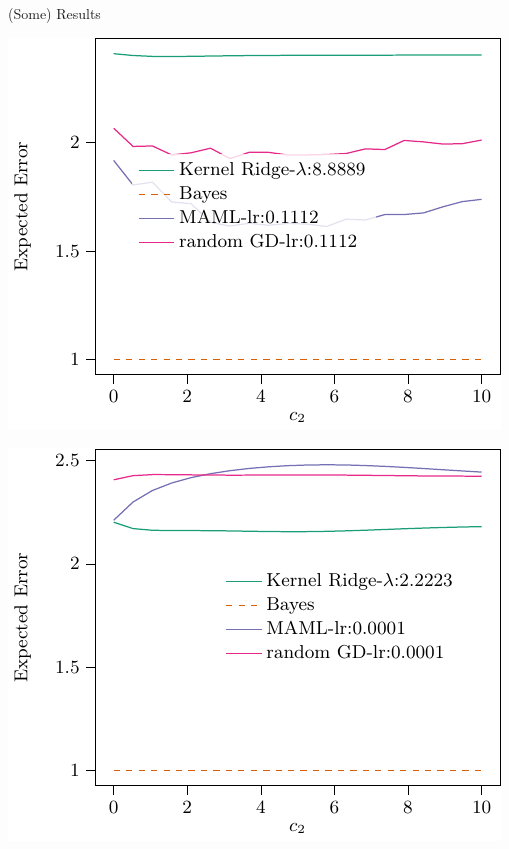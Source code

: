 \documentclass[aspectratio=169]{beamer}
\begin{document}
\begin{frame}{(Some) Results}
{\begin{itemize}
    \end{itemize}
    \centering
    \begin{minipage}{0.3\textwidth}
      \includegraphics[width=\textwidth]{figures/nonlin_c_1}    
    \end{minipage}%
    \begin{minipage}{0.3\textwidth}
      \includegraphics[width=\textwidth]{figures/nonlin_c_2}    
    \end{minipage}%
    \begin{minipage}{0.3\textwidth}

\end{minipage}}
\end{frame}
\end{document}

